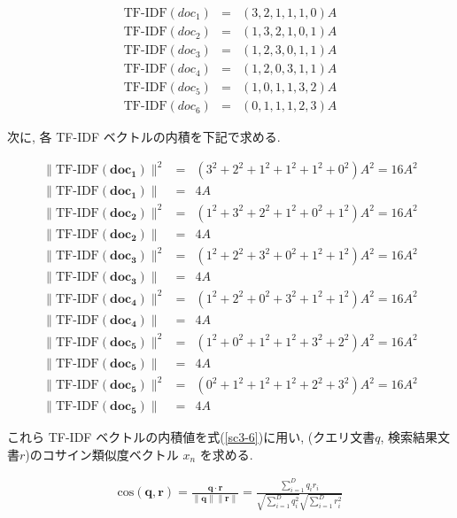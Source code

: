 \documentclass[a4paper,12pt]{jsreport}
\begin{document}
\begin{eqnarray}
\text{TF-IDF}(doc_1) &=& (3, 2, 1, 1, 1, 0)A \\ 
\text{TF-IDF}(doc_2) &=& (1, 3, 2, 1, 0, 1)A \\ 
\text{TF-IDF}(doc_3) &=& (1, 2, 3, 0, 1, 1)A \\ 
\text{TF-IDF}(doc_4) &=& (1, 2, 0, 3, 1, 1)A \\ 
\text{TF-IDF}(doc_5) &=& (1, 0, 1, 1, 3, 2)A \\ 
\text{TF-IDF}(doc_6) &=& (0, 1, 1, 1, 2, 3)A
\label{sc3-4}
\end{eqnarray}

次に, 各 TF-IDF ベクトルの内積を下記で求める.

\begin{eqnarray}
\|\text{TF-IDF}(\mathbf{doc_1})\|^2 &=& (3^2+2^2+1^2+1^2+1^2+0^2)A^2 = 16A^2\\
\|\text{TF-IDF}(\mathbf{doc_1})\| &=& 4A\\
\|\text{TF-IDF}(\mathbf{doc_2})\|^2 &=& (1^2+3^2+2^2+1^2+0^2+1^2)A^2 = 16A^2\\
\|\text{TF-IDF}(\mathbf{doc_2})\| &=& 4A\\
\|\text{TF-IDF}(\mathbf{doc_3})\|^2 &=& (1^2+2^2+3^2+0^2+1^2+1^2)A^2 = 16A^2\\
\|\text{TF-IDF}(\mathbf{doc_3})\| &=& 4A\\
\|\text{TF-IDF}(\mathbf{doc_4})\|^2 &=& (1^2+2^2+0^2+3^2+1^2+1^2)A^2 = 16A^2\\
\|\text{TF-IDF}(\mathbf{doc_4})\| &=& 4A\\
\|\text{TF-IDF}(\mathbf{doc_5})\|^2 &=& (1^2+0^2+1^2+1^2+3^2+2^2)A^2 = 16A^2\\
\|\text{TF-IDF}(\mathbf{doc_5})\| &=& 4A\\
\|\text{TF-IDF}(\mathbf{doc_5})\|^2 &=& (0^2+1^2+1^2+1^2+2^2+3^2)A^2 = 16A^2\\
\|\text{TF-IDF}(\mathbf{doc_5})\| &=& 4A
\label{sc3-5}
\end{eqnarray}

これら TF-IDF ベクトルの内積値を式(\ref{sc3-6})に用い,  
(クエリ文書$q$, 検索結果文書$r$)のコサイン類似度ベクトル $x_n$ を求める.

\begin{eqnarray}
\text{cos}(\mathbf{q}, \mathbf{r}) = \frac{\mathbf{q} \cdot \mathbf{r}}{\|\mathbf{q}\| \|\mathbf{r}\|}
= \frac{\sum_{i=1}^D q_i r_i}{\sqrt{\sum_{i=1}^D q_i^2} \sqrt{\sum_{i=1}^D r_i^2}}
\label{sc3-6}
\end{eqnarray}
\end{document}
